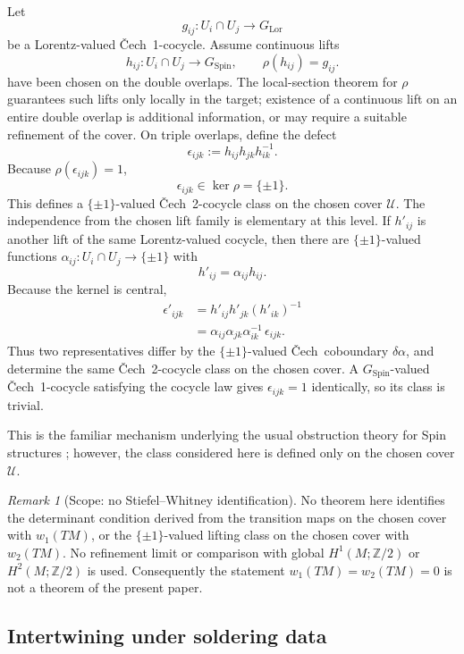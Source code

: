 \documentclass[11pt,a4paper]{article}
\theoremstyle{definition}
\theoremstyle{remark}
\newtheorem{remark}[theorem]{Remark}
\newcommand{\Ztwo}{\mathbb{Z}/2}
\newcommand{\SpinG}{G_{\mathrm{Spin}}}
\newcommand{\LorG}{G_{\mathrm{Lor}}}
\newcommand{\Cech}{\ifmmode\text{\v{C}ech}\else\v{C}ech\fi}
\newcommand{\cU}{\mathcal{U}}
\begin{document}
Let
\[
   g_{ij}:U_i\cap U_j\to\LorG
\]
be a Lorentz-valued \Cech\ 1-cocycle.  Assume continuous lifts
\[
   h_{ij}:U_i\cap U_j\to\SpinG,
   \qquad
   \rho(h_{ij})=g_{ij}.
\tag{9.1}
\]
have been chosen on the double overlaps.  The local-section theorem for
\(\rho\) guarantees such lifts only locally in the target; existence of a
continuous lift on an entire double overlap is additional information, or
may require a suitable refinement of the cover.  On triple overlaps, define
the defect
\[
   \epsilon_{ijk}
   :=
   h_{ij}h_{jk}h_{ik}^{-1}.
\tag{9.2}
\]
Because \(\rho(\epsilon_{ijk})=1\),
\[
   \epsilon_{ijk}\in\ker\rho=\{\pm1\}.
\tag{9.3}
\]
This defines a \(\{\pm1\}\)-valued \Cech\ 2-cocycle class on the chosen cover \(\cU\).
The independence from the chosen lift family is elementary at this level.
If \(h'_{ij}\) is another lift of the same Lorentz-valued cocycle, then
there are \(\{\pm1\}\)-valued functions
\(\alpha_{ij}:U_i\cap U_j\to\{\pm1\}\) with
\[
    h'_{ij}=\alpha_{ij}h_{ij}.
\]
Because the kernel is central,
\[
\begin{aligned}
 \epsilon'_{ijk}
 &=h'_{ij}h'_{jk}(h'_{ik})^{-1}\\
 &=\alpha_{ij}\alpha_{jk}\alpha_{ik}^{-1}\,
   \epsilon_{ijk}.
\end{aligned}
\tag{9.3a}\label{eq:obstruction-coboundary}
\]
Thus two representatives differ by the \(\{\pm1\}\)-valued \Cech\ coboundary \(\delta\alpha\), and determine the same \Cech\ 2-cocycle class on the chosen cover.
A \(\SpinG\)-valued \Cech\ 1-cocycle satisfying the cocycle law gives \(\epsilon_{ijk}=1\) identically, so
its class is trivial.

This is the familiar mechanism underlying the usual obstruction theory for
Spin structures \cite{Steenrod,MilnorStasheff,LawsonMichelsohn}; however,
the class considered here is defined only on the chosen cover \(\cU\).

\begin{remark}[Scope: no Stiefel--Whitney identification]
\label{bdry:no-sw}
No theorem here identifies the determinant condition derived from the transition maps on the chosen cover with \(w_1(TM)\),
or the \(\{\pm1\}\)-valued lifting class on the chosen cover with \(w_2(TM)\).
No refinement limit or comparison with global
\(H^{1}(M;\Ztwo)\) or \(H^{2}(M;\Ztwo)\) is used.  Consequently the
statement \(w_1(TM)=w_2(TM)=0\) is not a theorem of the present paper.
\end{remark}

\subsection{Intertwining under soldering data}
\end{document}

